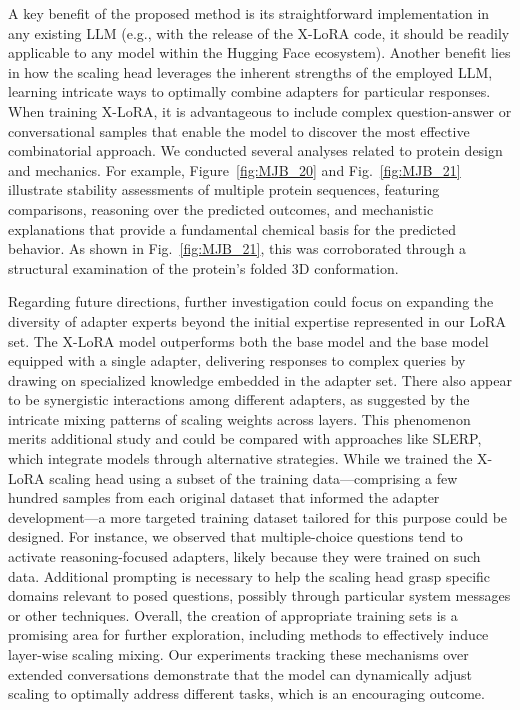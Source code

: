 A key benefit of the proposed method is its straightforward implementation in any existing LLM (e.g., with the release of the X-LoRA code, it should be readily applicable to any model within the Hugging Face ecosystem). Another benefit lies in how the scaling head leverages the inherent strengths of the employed LLM, learning intricate ways to optimally combine adapters for particular responses. When training X-LoRA, it is advantageous to include complex question-answer or conversational samples that enable the model to discover the most effective combinatorial approach. We conducted several analyses related to protein design and mechanics. For example, Figure~\ref{fig:MJB_20} and Fig.~\ref{fig:MJB_21} illustrate stability assessments of multiple protein sequences, featuring comparisons, reasoning over the predicted outcomes, and mechanistic explanations that provide a fundamental chemical basis for the predicted behavior. As shown in Fig.~\ref{fig:MJB_21}, this was corroborated through a structural examination of the protein’s folded 3D conformation.

Regarding future directions, further investigation could focus on expanding the diversity of adapter experts beyond the initial expertise represented in our LoRA set. The X-LoRA model outperforms both the base model and the base model equipped with a single adapter, delivering responses to complex queries by drawing on specialized knowledge embedded in the adapter set. There also appear to be synergistic interactions among different adapters, as suggested by the intricate mixing patterns of scaling weights across layers. This phenomenon merits additional study and could be compared with approaches like SLERP, which integrate models through alternative strategies. While we trained the X-LoRA scaling head using a subset of the training data—comprising a few hundred samples from each original dataset that informed the adapter development—a more targeted training dataset tailored for this purpose could be designed. For instance, we observed that multiple-choice questions tend to activate reasoning-focused adapters, likely because they were trained on such data. Additional prompting is necessary to help the scaling head grasp specific domains relevant to posed questions, possibly through particular system messages or other techniques. Overall, the creation of appropriate training sets is a promising area for further exploration, including methods to effectively induce layer-wise scaling mixing. Our experiments tracking these mechanisms over extended conversations demonstrate that the model can dynamically adjust scaling to optimally address different tasks, which is an encouraging outcome.

